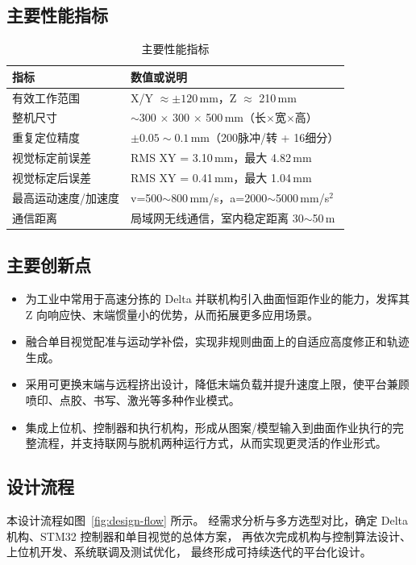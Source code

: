﻿\documentclass[UTF8,zihao=-4,fontset=windows]{ctexart}
\begin{document}
\subsection{主要性能指标}
\begin{table}[h]
  \centering
  \begin{tabular}{p{}p{}}
    \toprule
    指标 & 数值或说明 \\
    \midrule
    有效工作范围 & X/Y $\approx \pm 120$\,mm，Z $\approx$ 210\,mm \\
    整机尺寸 & $\sim$300 $\times$ 300 $\times$ 500\,mm（长$\times$宽$\times$高） \\
    重复定位精度 & $\pm 0.05 \sim 0.1$\,mm（200脉冲/转 + 16细分） \\
    视觉标定前误差 & RMS XY = 3.10\,mm，最大 4.82\,mm \\
    视觉标定后误差 & RMS XY = 0.41\,mm，最大 1.04\,mm \\
    最高运动速度/加速度 & v=500$\sim$800\,mm/s，a=2000$\sim$5000\,mm/s$^2$ \\
    通信距离 & 局域网无线通信，室内稳定距离 30$\sim$50\,m \\
    \bottomrule
  \end{tabular}
  \caption{主要性能指标}
\end{table}

\subsection{主要创新点}
\begin{itemize}
  \item 为工业中常用于高速分拣的 Delta 并联机构引入曲面恒距作业的能力，发挥其 Z 向响应快、末端惯量小的优势\cite{clavel1988delta}，从而拓展更多应用场景。
  \item 融合单目视觉配准与运动学补偿，实现非规则曲面上的自适应高度修正和轨迹生成。
  \item 采用可更换末端与远程挤出设计，降低末端负载并提升速度上限，使平台兼顾喷印、点胶、书写、激光等多种作业模式。
  \item 集成上位机、控制器和执行机构，形成从图案/模型输入到曲面作业执行的完整流程，并支持联网与脱机两种运行方式，从而实现更灵活的作业形式。
\end{itemize}


\subsection{设计流程}
本设计流程如图~\ref{fig:design-flow} 所示。
经需求分析与多方选型对比，确定 Delta 机构、STM32 控制器和单目视觉的总体方案，
再依次完成机构与控制算法设计、上位机开发、系统联调及测试优化，
最终形成可持续迭代的平台化设计。
\end{document}
